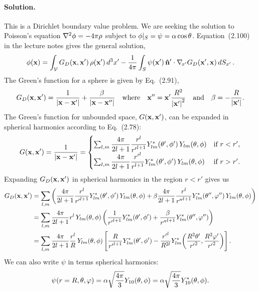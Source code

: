 \documentclass[11pt]{article}
\newcommand{\beq}{\begin{equation*}}
\newcommand{\eeq}{\end{equation*}}
\newcommand{\beqn}{\begin{equation}}
\newcommand{\eeqn}{\end{equation}}
\newenvironment{solution}
{
    \paragraph{Solution.}
    \ignorespaces
}
{
    \bigskip
}
\begin{document}
\begin{solution}
	This is a Dirichlet boundary value problem.  We are seeking the solution to Poisson's equation $\nabla^2\phi = -4\pi\rho$ subject to $\phi|_S = \psi = \alpha \cos\theta$.  Equation~(2.100) in the lecture notes gives the general solution,
	\beqn \label{sol3}
		\phix = \intV \Gdxxp \, \rhoxp \dcxp - \frac{1}{4\pi} \intS \psixp \, \nh' \cdot \nabxp \Gdxpx \dSxp.
	\eeqn
	The Green's function for a sphere is given by Eq.~(2.91),
	\beq
		\Gdxxp = \frac{1}{\abs{\vx - \vx'}} + \frac{\beta}{\abs{\vx - \vx''}} \qq{where} \vx'' = \vx' \frac{R^2}{\absxp^2} \qand \beta = - \frac{R}{\absxp}.
	\eeq
	The Green's function for unbounded space, $G(\mathbf{x}, \mathbf{x}')$, can be expanded in spherical harmonics according to Eq.~(2.78):
	\beq
		\Gxxp = \frac{1}{\abs{\vx - \vx'}}
		= \begin{cases} \sum_{l,m} \dfrac{4\pi}{2l + 1} \dfrac{r^l}{{r'}^{l + 1}} \Ylm^*\tvp \, \Ylm\tv & \text{if } r < r', \\
		\sum_{l,m} \dfrac{4\pi}{2l + 1} \dfrac{{r'}^l}{r^{l + 1}} \Ylm^*\tvp \, \Ylm\tv & \text{if } r > r'. \end{cases}
	\eeq
	Expanding $G_D(\mathbf{x}, \mathbf{x}')$ in spherical harmonics in the region $r < r'$ gives us
	\begin{align*}
		G_D(\mathbf{x}, \mathbf{x}') &= \sum_{l,m} \left( \frac{4\pi}{2l + 1} \frac{r^l}{{r'}^{l + 1}} Y_{l m}^*(\theta', \phi') \, Y_{l m}(\theta, \phi) + \beta \frac{4\pi}{2l + 1} \frac{r^l}{{r''}^{l + 1}} Y_{l m}^*(\theta'', \varphi'') \, Y_{l m}(\theta, \phi) \right) \\
		&= \sum_{l,m} \frac{4\pi}{2l + 1} r^l \, Y_{l m}(\theta, \phi) \left( \frac{1}{{r'}^{l + 1}} Y_{l m}^*(\theta', \phi') + \frac{\beta}{{r''}^{l + 1}} Y_{l m}^*(\theta'', \varphi'') \right) \\
		&= \sum_{l,m} \frac{4\pi}{2l + 1} \frac{r^l}{R} \, Y_{l m}(\theta, \phi) \left[ \frac{R}{{r'}^{l + 1}} Y_{l m}^*(\theta', \phi') - \frac{{r'}^l}{R^{2l}} Y_{l m}^*\!\left( \frac{R^2 \theta'}{{r'}^2}, \frac{R^2 \varphi'}{{r'}^2} \right) \right].
	\end{align*}
	We can also write $\psi$ in terms spherical harmonics:
	\beq
		\psi(r=R, \tht, \vph) = \alp \sqfr{4\pi}{3} Y_{1 0}\tv = \alp \sqfr{4\pi}{3} Y_{1 0}^*\tv.
	\eeq
	

\end{solution}
\end{document}
